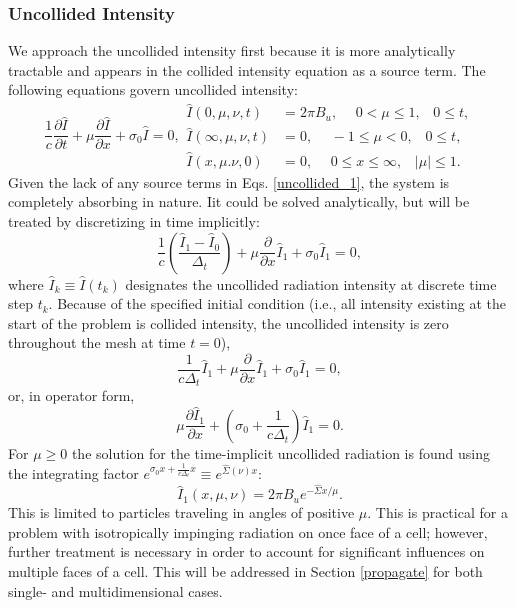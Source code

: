 \subsubsection{Uncollided Intensity}
We approach the uncollided intensity first
because it is more analytically tractable and appears in the collided intensity
equation as a source term. The
following equations govern uncollided intensity:
\begin{subequations} \label{uncollided_1}
\begin{equation}
\frac{1}{c}\frac{\partial\hat I}{\partial t} + \mu\frac{\partial\hat
  I}{\partial x} + \sigma_0\hat I = 0,
\end{equation}
\begin{align}
\hat I(0,\mu,\nu,t)&=2\pi B_u,\hspace{15pt} 0<\mu\leq1, \hspace{10pt}0\leq t,\\
\hat I(\infty,\mu,\nu,t)&=0,\hspace{15pt} -1\leq\mu<0,\hspace{10pt}0\leq t,\\
\hat I(x,\mu.\nu,0)&=0, \hspace{15pt}0\leq x\leq\infty,\hspace{10pt}|\mu|\leq1.
\end{align}
\end{subequations}
Given the lack of any source terms in Eqs. \eqref{uncollided_1}, the
system is completely absorbing in nature.  Iit could be solved
analytically, but will be treated by discretizing in time implicitly:
\[ \frac{1}{c}\left(\frac{\hat I_1-\hat I_0}{\Delta_t}\right) +
  \mu\frac{\partial}{\partial x}\hat I_1 + \sigma_0\hat I_1=0,\]
where $\hat I_k\equiv\hat I(t_k)$ designates the uncollided radiation intensity
at discrete time step $t_k$.  Because of the specified initial condition (i.e.,
all intensity existing at the start of the problem is collided
intensity, the uncollided intensity is zero throughout the mesh at time
$t=0$),
\[\frac{1}{c\Delta_t}{\hat I_1} + \mu\frac{\partial}{\partial x}\hat
I_1 + \sigma_0\hat I_1=0,\]
or, in operator form,
\begin{equation}
\mu\frac{\partial\hat I_1}{\partial x} +
  \left(\sigma_0+\frac{1}{c\Delta_t}\right)\hat I_1 = 0 \label{uncol_ode}.
\end{equation}
For $\mu\geq0$ the solution for the time-implicit uncollided radiation is found
using the integrating factor $e^{\sigma_0x+\frac{1}{c\Delta_t}x}\equiv
e^{\hat\Sigma(\nu)x}$:
\begin{equation}
\hat I_1(x,\mu,\nu)=2\pi B_ue^{-\hat\Sigma x/\mu} \label{uncol_solve}.
\end{equation}
This is limited to particles traveling in angles of positive $\mu$.  This is
practical for a problem with isotropically impinging radiation on once face
of a cell; however, further treatment is necessary in order to
account for significant influences on multiple faces of a cell.  This will be
addressed in Section \ref{propagate} for both single- and multidimensional
cases.

